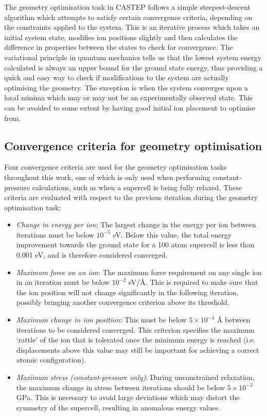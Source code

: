 The geometry optimisation task in CASTEP follows a simple steepest-descent algorithm which attempts to satisfy certain convergence criteria, depending on the constraints applied to the system. This is an iterative process which takes an initial system state, modifies ion positions slightly and then calculates the difference in properties between the states to check for convergence. The variational principle in quantum mechanics tells us that the lowest system energy calculated is always an upper bound for the ground state energy, thus providing a quick and easy way to check if modifications to the system are actually optimising the geometry. The exception is when the system converges upon a local minima which may or may not be an experimentally observed state. This can be avoided to some extent by having good initial ion placement to optimise from.


\subsection{Convergence criteria for geometry optimisation}

Four convergence criteria are used for the geometry optimisation tasks throughout this work, one of which is only used when performing constant-pressure calculations, such as when a supercell is being fully relaxed. These criteria are evaluated with respect to the previous iteration during the geometry optimisation task:

\begin{itemize}
\item \emph{Change in energy per ion}: The largest change in the energy per ion between iterations must be below $10^{-5}$ eV. Below this value, the total energy improvement towards the ground state for a 100 atom supercell is less than 0.001 eV, and is therefore considered converged.
\item \emph{Maximum force on an ion}: The maximum force requirement on any single ion in an iteration must be below $10^{-2}$ eV/\r{A}. This is required to make sure that the ion position will not change significantly in the following iteration, possibly bringing another convergence criterion above its threshold.
\item \emph{Maximum change in ion position}: This must be below $5 \times 10^{-4}$ \r{A} between iterations to be considered converged. This criterion specifies the maximum `rattle' of the ion that is tolerated once the minimum energy is reached (i.e. displacements above this value may still be important for achieving a correct atomic configuration). 
\item \emph{Maximum stress (constant-pressure only)}: During unconstrained relaxation, the maximum change in stress between iterations should be below $5 \times 10^{-2}$ GPa. This is necessary to avoid large deviations which may distort the symmetry of the supercell, resulting in anomalous energy values.
\end{itemize}


